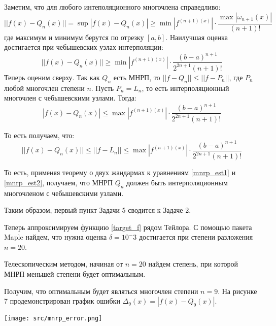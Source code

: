 \documentclass[a4paper, fontsize=14pt]{article}
\begin{document}
    Заметим, что для любого интеполяционного многочлена справедливо:
    \begin{equation*}
        || f(x) - Q_n(x) || = \operatorname{sup} | f(x) - Q_n(x) | \geq \operatorname{min}|f^{(n+1) (x)} | \cdot \frac{\operatorname{max}|\omega_{n+1}(x)|}{(n+1)!}
    \end{equation*}
    где максимум и минимум берутся по отрезку $[a, b]$.
    Наилучшая оценка достигается при чебышевских узлах интерполяции:
    \begin{equation}
        \label{mnrp_est1}
        || f(x) - Q_n(x) || \geq \operatorname{min}|f^{(n+1) (x)} | \cdot \frac{(b-a)^{n+1}}{2^{2n+1} (n+1)!}
    \end{equation}
    Теперь оценим сверху. Так как $Q_n$ есть МНРП, то $||f - Q_n || \leq || f - P_n ||$, где $P_n$ любой многочлен степени $n$. Пусть $P_n = L_n$, то есть интерполяционный многочлен с чебышевскими узлами. Тогда:
    \begin{equation*}
        | f(x) - Q_n(x) | \leq \operatorname{max} |f^{(n+1)(x)}| \cdot \frac{(b-a)^{n+1}}{2^{2n+1} (n+1)!}
    \end{equation*}

    То есть получаем, что:
    \begin{equation}
        \label{mnrp_est2}
        || f(x) - Q_n(x) || \leq || f - L_n || \leq \operatorname{max} |f^{(n+1)(x)}| \cdot \frac{(b-a)^{n+1}}{2^{2n+1} (n+1)!}
    \end{equation}

    То есть, применяя теорему о двух жандармах к уравнениям \eqref{mnrp_est1} и \eqref{mnrp_est2}, получаем, что МНРП $Q_n$ должен быть интерполяционным многочленом с чебышевскими узлами.

    Таким образом, первый пункт Задачи 5 сводится к Задаче 2.

    Теперь аппроксимируем функцию \eqref{target_f} рядом Тейлора. С помощью пакета Maple найдем, что нужна оценка $\delta = 10^-3$ достигается при степени разложения $n=20$. 

    Телескопическим методом, начиная от $n=20$ найдем степень, при которой МНРП меньшей степени будет оптимальным. 
    
    Получим, что оптимальным будет являться многочлен степени $n=9$.
    На рисунке 7 продемонстрирован график ошибки $\Delta_9(x) = | f(x) - Q_9(x) |$.
    \begin{center}
        \texttt{[image: src/mnrp\_error.png]}
    \end{center}
\end{document}

